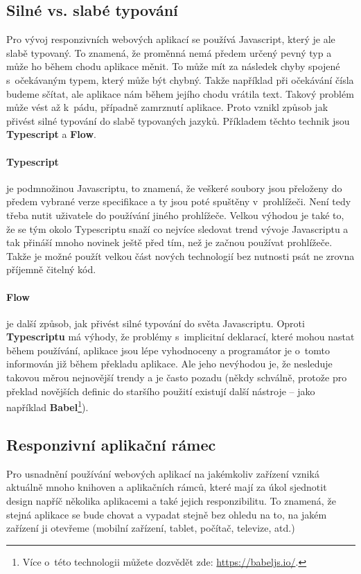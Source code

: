 \subsection{Silné vs. slabé typování}
\par Pro vývoj responzivních webových aplikací se používá Javascript, který je ale slabě typovaný. To znamená, že proměnná nemá předem určený pevný typ a může ho během chodu aplikace měnit. To může mít za následek chyby spojené s~očekávaným typem, který může být chybný. Takže například při očekávání čísla budeme sčítat, ale aplikace nám během jejího chodu vrátila text. Takový problém může vést až k~pádu, případně zamrznutí aplikace. Proto vznikl způsob jak přivést silné typování do slabě typovaných jazyků. Příkladem těchto technik jsou \textbf{Typescript} a \textbf{Flow}.

\paragraph{Typescript} je podmnožinou Javascriptu, to znamená, že veškeré soubory jsou přeloženy do předem vybrané verze specifikace a ty jsou poté spuštěny v~prohlížeči. Není tedy třeba nutit uživatele do používání jiného prohlížeče. Velkou výhodou je také to, že se tým okolo Typescriptu snaží co nejvíce sledovat trend vývoje Javascriptu a tak přináší mnoho novinek ještě před tím, než je začnou používat prohlížeče. Takže je možné použít velkou část nových technologií bez nutnosti psát ne zrovna příjemně čitelný kód.

\paragraph{Flow} je další způsob, jak přivést silné typování do světa Javascriptu. Oproti \textbf{Typescriptu} má výhody, že problémy s~implicitní deklarací, které mohou nastat během používání, aplikace jsou lépe vyhodnoceny a programátor je o~tomto informován již během překladu aplikace. Ale jeho nevýhodou je, že nesleduje takovou měrou nejnovější trendy a je často pozadu (někdy schválně, protože pro překlad novějších definic do staršího použití existují další nástroje -- jako například \textbf{Babel}\footnote{Více o~této technologii můžete dozvědět zde: \url{https://babeljs.io/}.}).

\subsection{Responzivní aplikační rámec}
\par Pro usnadnění používání webových aplikací na jakémkoliv zařízení vzniká aktuálně mnoho knihoven a aplikačních rámců, které mají za úkol sjednotit design napříč několika aplikacemi a také jejich responzibilitu. To znamená, že stejná aplikace se bude chovat a vypadat stejně bez ohledu na to, na jakém zařízení ji otevřeme (mobilní zařízení, tablet, počítač, televize, atd.)

